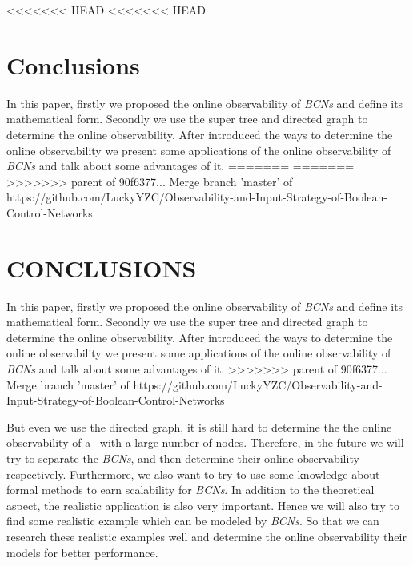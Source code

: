 <<<<<<< HEAD
<<<<<<< HEAD
\section{Conclusions}
\label{sec:con}
In this paper, firstly we proposed the online observability of {\em BCNs} and define its mathematical form. Secondly we use the super tree and directed graph to determine the online observability. After introduced the ways to determine the online observability we present some applications of the online observability of {\em BCNs} and talk about some advantages of it. 
=======
=======
>>>>>>> parent of 90f6377... Merge branch 'master' of https://github.com/LuckyYZC/Observability-and-Input-Strategy-of-Boolean-Control-Networks
\section{CONCLUSIONS}

In this paper, firstly we proposed the online observability of {\em BCNs} and define its mathematical form. Secondly we use the super tree and directed graph to determine the online observability. After introduced the ways to determine the online observability we present some applications of the online observability of {\em BCNs} and talk about some advantages of it. %
>>>>>>> parent of 90f6377... Merge branch 'master' of https://github.com/LuckyYZC/Observability-and-Input-Strategy-of-Boolean-Control-Networks

But even we use the directed graph, it is still hard to determine the  the online observability of a \BCN\ with a large number of nodes. Therefore, in the future we will try to separate the {\em BCNs}, and then determine their online observability respectively. Furthermore, we also want to try to use some knowledge about formal methods to earn scalability for {\em BCNs}. In addition to the theoretical aspect, the realistic application is also very important. Hence we will also try to find some realistic example which can be modeled by {\em BCNs}. So that we can research these realistic examples well and determine the online observability their models for better performance.